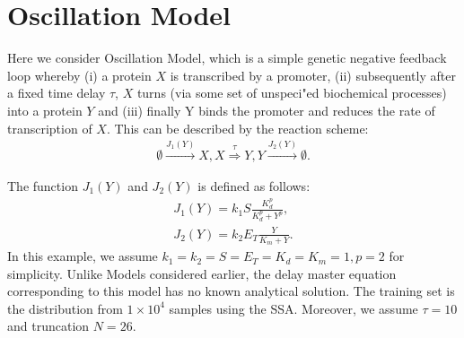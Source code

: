 \documentclass[a4paper,10pt]{article}
\begin{document}
\section{Oscillation Model}
Here we consider Oscillation Model, which is a simple genetic negative feedback loop whereby (i) a protein $X$ is transcribed by a promoter, (ii) subsequently after a fixed time delay $\tau$, $X$ turns (via some set of unspeci"ed biochemical processes) into a protein $Y$ and (iii) finally Y binds the promoter and reduces the rate of transcription of $X$. This can be described by the reaction scheme:
\begin{equation}\label{oscillation}
	\begin{aligned}
		\emptyset \xrightarrow{J_1(Y)} X,
		X\stackrel{\tau}\Rightarrow Y,
		Y\xrightarrow{J_2(Y)} \emptyset.
	\end{aligned}
\end{equation}

The function $J_1(Y)$ and $J_2(Y)$ is defined as follows:
\begin{equation}\label{oscillation}
	\begin{aligned}
	J_1(Y)=k_1S\frac{K^p_d}{K^p_d+Y^p},\\
	J_2(Y)=k_2E_T\frac{Y}{K_m+Y}.
	\end{aligned}
\end{equation}
In this example, we assume $k_1=k_2=S=E_T=K_d=K_m=1, p=2$ for simplicity. Unlike Models considered earlier, the delay master equation corresponding to this model has no known analytical solution. The training set is the distribution from $1 \times 10^4$ samples using the SSA. Moreover, we assume $\tau=10$ and truncation $N=26$.
\end{document}
